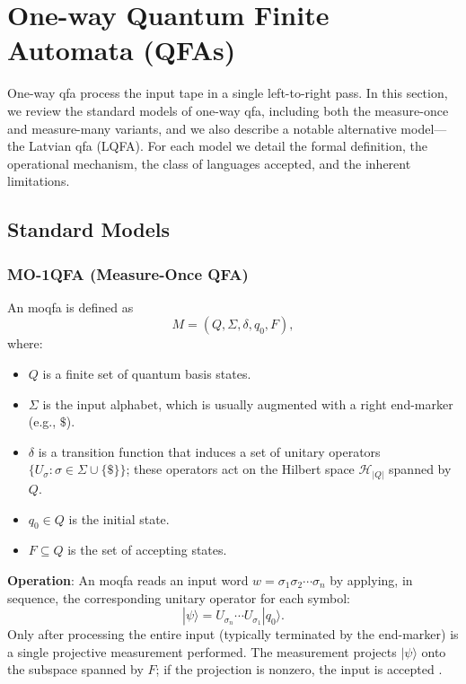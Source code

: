 
\section{One-way Quantum Finite Automata (QFAs)}
\label{sec:one-way-qfas}

One-way \gls{qfa} process the input tape in a single left-to-right pass. In this section, we review the standard models of one-way \gls{qfa}, including both the measure-once and measure-many variants, and we also describe a notable alternative model—the Latvian \gls{qfa} (LQFA). For each model we detail the formal definition, the operational mechanism, the class of languages accepted, and the inherent limitations.

\subsection{Standard Models}
\label{subsec:standard-models}

\subsubsection{MO-1QFA (Measure-Once QFA)}
\label{sssec:mo-1qfa}
\begin{definition}[MO-1QFA]
An \gls{moqfa} is defined as 
\[
M = (Q, \Sigma, \delta, q_0, F),
\]
where:
\begin{itemize}
    \item \( Q \) is a finite set of quantum basis states.
    \item \( \Sigma \) is the input alphabet, which is usually augmented with a right end-marker (e.g., \( \$ \)).
    \item \( \delta \) is a transition function that induces a set of unitary operators \( \{ U_\sigma : \sigma \in \Sigma \cup \{\$\} \} \); these operators act on the Hilbert space \( \mathcal{H}_{|Q|} \) spanned by \( Q \).
    \item \( q_0 \in Q \) is the initial state.
    \item \( F \subseteq Q \) is the set of accepting states.
\end{itemize}
\end{definition}

\textbf{Operation}:  
An \gls{moqfa} reads an input word \( w = \sigma_1\sigma_2\cdots\sigma_n \) by applying, in sequence, the corresponding unitary operator for each symbol:
\[
|\psi\rangle = U_{\sigma_n} \cdots U_{\sigma_1} |q_0\rangle.
\]
Only after processing the entire input (typically terminated by the end-marker) is a single projective measurement performed. The measurement projects \( |\psi\rangle \) onto the subspace spanned by \( F \); if the projection is nonzero, the input is accepted \cite{moore2000quantum,bertoni2001regular}.

